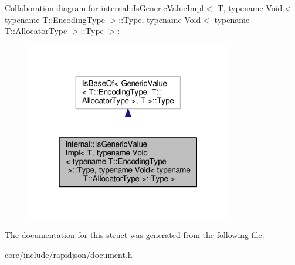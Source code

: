 Collaboration diagram for internal\+:\+:Is\+Generic\+Value\+Impl$<$ T, typename Void$<$ typename T\+:\+:Encoding\+Type $>$\+:\+:Type, typename Void$<$ typename T\+:\+:Allocator\+Type $>$\+:\+:Type $>$\+:
\nopagebreak
\begin{figure}[H]
\begin{center}
\leavevmode
\includegraphics[width=256pt]{structinternal_1_1IsGenericValueImpl_3_01T_00_01typename_01Void_3_01typename_01T_1_1EncodingType7e857df1933f83b668633c9d17260965}
\end{center}
\end{figure}


The documentation for this struct was generated from the following file\+:\begin{DoxyCompactItemize}
\item 
core/include/rapidjson/\hyperlink{document_8h}{document.\+h}\end{DoxyCompactItemize}

